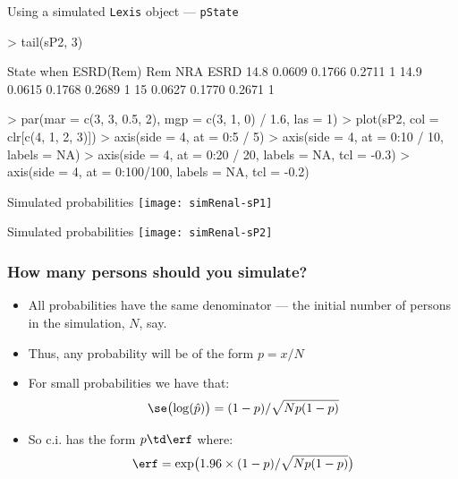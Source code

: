 \begin{frame}{Using a simulated \texttt{Lexis} object --- \texttt{pState}}
\begin{Schunk}
\begin{Soutput}
\end{Soutput}
\begin{Sinput}
> tail(sP2, 3)
\end{Sinput}
\begin{Soutput}
      State
when   ESRD(Rem)    Rem    NRA ESRD
  14.8    0.0609 0.1766 0.2711    1
  14.9    0.0615 0.1768 0.2689    1
  15      0.0627 0.1770 0.2671    1
\end{Soutput}
\begin{Sinput}
> par(mar = c(3, 3, 0.5, 2), mgp = c(3, 1, 0) / 1.6, las = 1)
> plot(sP2, col = clr[c(4, 1, 2, 3)])
> axis(side = 4, at = 0:5 / 5)
> axis(side = 4, at = 0:10 / 10, labels = NA)
> axis(side = 4, at = 0:20 / 20, labels = NA, tcl = -0.3)
> axis(side = 4, at = 0:100/100, labels = NA, tcl = -0.2)
\end{Sinput}
\end{Schunk}
\end{frame}

\begin{frame}{Simulated probabilities}
\texttt{[image: simRenal-sP1]}
\end{frame}

\begin{frame}{Simulated probabilities}
\texttt{[image: simRenal-sP2]}
\end{frame}

\begin{frame}
   \frametitle{How many persons should you simulate?}
\pause
   \begin{itemize}[<+->]
   \item All probabilities have the same denominator --- the initial
     number of persons in the simulation, $N$, say.
   \item Thus, any probability will be of the form $p=x/N$
   \item For small probabilities we have that:
\[
 \se\bigl(\log(\hat p)\bigr) = (1-p)/\sqrt{N p (1-p)}
\]
\item So c.i. has the form $p\td \erf$ where:
\[
 \erf = \exp\bigl( 1.96 \times (1-p)/\sqrt{N p (1-p)} \bigr)
\]
   \end{itemize}
\end{frame}

